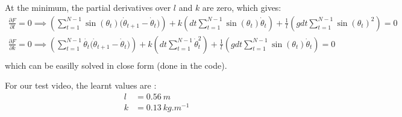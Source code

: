 \documentclass[11pt, oneside]{amsart}
\begin{document}
At the minimum, the partial derivatives over $l$ and $k$ are zero, which gives:
\begin{align*}
  \frac{\partial F}{\partial l} = 0 \implies
    \left( \sum_{t=1}^{N-1}{\sin(\theta_t)(\dot{\theta}_{t+1} - \dot{\theta}_{t}}) \right) +
    k \left( dt \sum_{t=1}^{N-1}{\sin(\theta_t)\dot{\theta}_{t}} \right) +
    \frac{1}{l} \left( gdt \sum_{t=1}^{N-1}{\sin(\theta_t)^2} \right) = 0\\
  \frac{\partial F}{\partial k} = 0 \implies
    \left( \sum_{t=1}^{N-1}{\dot{\theta_t}(\dot{\theta}_{t+1} - \dot{\theta}_{t}}) \right) +
    k \left( dt \sum_{t=1}^{N-1}{\dot{\theta}_{t}^2} \right) +
    \frac{1}{l} \left( gdt \sum_{t=1}^{N-1}{\sin(\theta_t) \dot{\theta}_t} \right) = 0\\
\end{align*}
which can be easilly solved in close form (done in the code).

For our test video, the learnt values are :
\begin{align*}
  l &= 0.56 \ m\\
  k &= 0.13 \ kg.m^{-1}
\end{align*}
\end{document}
